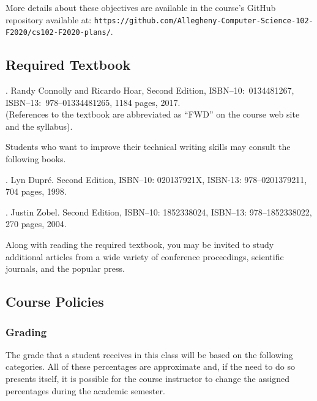 \documentclass[11pt]{article}
\newcommand{\url}[1]{\lstinline{#1}}
\begin{document}
\vspace*{.05in}

\noindent More details about these objectives are available in the course's
GitHub repository available at:
\url{https://github.com/Allegheny-Computer-Science-102-F2020/cs102-F2020-plans/}.

\subsection*{Required Textbook}

. Randy Connolly and Ricardo Hoar,
Second Edition, ISBN--10:\ 0134481267, ISBN--13:\ 978--01334481265, 1184 pages,
2017. \\ (References to the textbook are abbreviated as ``FWD'' on the course
web site and the syllabus).

\vspace*{.1in}

\noindent Students who want to improve their technical writing skills may
consult the following books.

\vspace*{.1in}

. Lyn Dupr\'e.
Second Edition,  ISBN--10: 020137921X, ISBN-13: 978--0201379211, 704 pages,
1998.
%
\vspace*{.5em}

. Justin Zobel. Second Edition,
ISBN--10: 1852338024, ISBN--13: 978--1852338022, 270 pages, 2004.

\vspace*{.1in}

\noindent Along with reading the required textbook, you may be invited to study
additional articles from a wide variety of conference proceedings, scientific
journals, and the popular press.

\vspace*{-.5em}

\subsection*{Course Policies}

\subsubsection*{Grading}

The grade that a student receives in this class will be based on the following
categories. All of these percentages are approximate and, if the need to do so
presents itself, it is possible for the course instructor to change the assigned
percentages during the academic semester.
\end{document}
